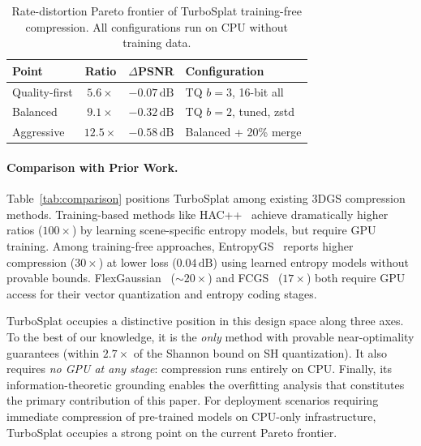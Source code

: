 \documentclass[sigconf,review]{acmart}
\newcommand{\ours}{TurboSplat}
\newcommand{\dB}{\,\text{dB}}
\begin{document}
\begin{table}[t]
\centering
\caption{Rate-distortion Pareto frontier of \ours{} training-free compression. All configurations run on CPU without training data.}
\label{tab:pareto}
\small
\begin{tabular}{lccl}
\toprule
\textbf{Point} & \textbf{Ratio} & \textbf{$\Delta$PSNR} & \textbf{Configuration} \\
\midrule
Quality-first  & $5.6{\times}$ & $-0.07\dB$ & TQ $b{=}3$, 16-bit all \\
Balanced       & $9.1{\times}$ & $-0.32\dB$ & TQ $b{=}2$, tuned, zstd \\
Aggressive     & $12.5{\times}$ & $-0.58\dB$ & Balanced + 20\% merge \\
\bottomrule
\end{tabular}
\end{table}

\paragraph{Comparison with Prior Work.}
Table~\ref{tab:comparison} positions \ours{} among existing 3DGS compression methods.
Training-based methods like HAC++~\cite{chen2025hacpp} achieve dramatically higher ratios ($100{\times}$) by learning scene-specific entropy models, but require GPU training.
Among training-free approaches, EntropyGS~\cite{entropygs2025} reports higher compression ($30{\times}$) at lower loss ($0.04\dB$) using learned entropy models without provable bounds.
FlexGaussian~\cite{flexgaussian2025} (${\sim}20{\times}$) and FCGS~\cite{chen2024fcgs} ($17{\times}$) both require GPU access for their vector quantization and entropy coding stages.

\ours{} occupies a distinctive position in this design space along three axes.
To the best of our knowledge, it is the \emph{only} method with provable near-optimality guarantees (within $2.7{\times}$ of the Shannon bound on SH quantization).
It also requires \emph{no GPU at any stage}: compression runs entirely on CPU.
Finally, its information-theoretic grounding enables the overfitting analysis that constitutes the primary contribution of this paper.
For deployment scenarios requiring immediate compression of pre-trained models on CPU-only infrastructure, \ours{} occupies a strong point on the current Pareto frontier.
\end{document}
